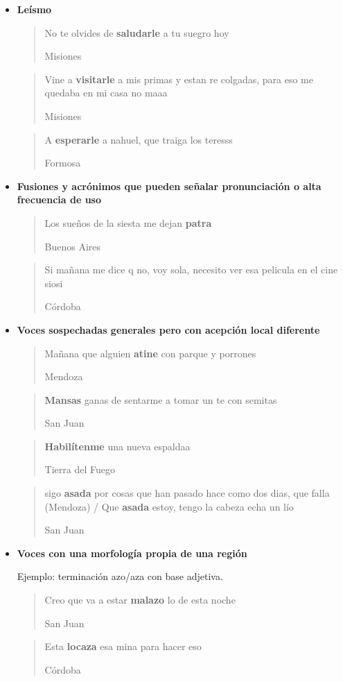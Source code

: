 \begin{itemize}
  \blockquote[Jujuy]{Me encantan los bohemios anti sistema que usan vans. Es como que seas ecologista y uses un cuaderno hecho con media \textbf{yunga}.}

\item \textbf{Leísmo}

  \blockquote[Misiones]{No te olvides de \textbf{saludarle} a tu suegro hoy}

  \blockquote[Misiones]{Vine a \textbf{visitarle} a mis primas y estan re colgadas, para eso me quedaba en mi casa no maaa }

  \blockquote[Formosa]{A \textbf{esperarle} a nahuel, que traiga los teresss }

\item \textbf{Fusiones y acrónimos que pueden señalar pronunciación o alta frecuencia de uso}

  \blockquote[Buenos Aires]{Los sueños de la siesta me dejan \textbf{patra} }

  \blockquote[Córdoba]{Si mañana me dice q no, voy sola, necesito ver esa pelicula en el cine siosi}


\item \textbf{Voces sospechadas generales pero con acepción local diferente}

  \blockquote[Mendoza]{Mañana que alguien \textbf{atine} con parque y porrones}

  \blockquote[San Juan]{\textbf{Mansas} ganas de sentarme a tomar un te con semitas}

  \blockquote[Tierra del Fuego]{\textbf{Habilítenme} una nueva espaldaa}

  \blockquote[San Juan]{sigo \textbf{asada} por cosas que han pasado hace como dos dias, que falla (Mendoza) / Que \textbf{asada} estoy, tengo la cabeza echa un lío}


\item \textbf{Voces con una morfología propia de una región}

Ejemplo: terminación azo/aza con base adjetiva.

  \blockquote[San Juan]{Creo que va a estar \textbf{malazo} lo de esta noche } 

  \blockquote[Córdoba]{Esta \textbf{locaza} esa mina para hacer eso}


\end{itemize}
